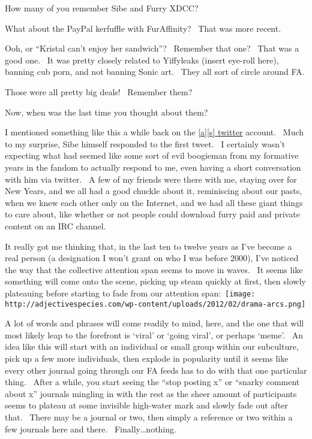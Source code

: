 How many of you remember Sibe and Furry XDCC?

What about the PayPal kerfuffle with FurAffinity? ~That was more recent.

Ooh, or ``Kristal can't enjoy her sandwich''? ~Remember that one? ~That
was a good one. ~It was pretty closely related to Yiffyleaks (insert
eye-roll here), banning cub porn, and not banning Sonic art. ~They all
sort of circle around FA.

Those were all pretty big deals! ~Remember them?

Now, when was the last time you thought about them?

I mentioned something like this a while back on the
\href{http://twitter.com/adjspecies}{{[}a{]}{[}s{]} twitter} account.
~Much to my surprise, Sibe himself responded to the first tweet. ~I
certainly wasn't expecting what had seemed like some sort of evil
boogieman from my formative years in the fandom to actually respond to
me, even having a short conversation with him via twitter. ~A few of my
friends were there with me, staying over for New Years, and we all had a
good chuckle about it, reminiscing about our pasts, when we knew each
other only on the Internet, and we had all these giant things to care
about, like whether or not people could download furry paid and private
content on an IRC channel.

It really got me thinking that, in the last ten to twelve years as I've
become a real person (a designation I won't grant on who I was before
2000), I've noticed the way that the collective attention span seems to
move in waves. ~It seems like something will come onto the scene,
picking up steam quickly at first, then slowly plateauing before
starting to fade from our attention
span:~\texttt{[image: http://adjectivespecies.com/wp-content/uploads/2012/02/drama-arcs.png]}

A lot of words and phrases will come readily to mind, here, and the one
that will most likely leap to the forefront is `viral' or `going viral',
or perhaps `meme'. ~An idea like this will start with an individual or
small group within our subculture, pick up a few more individuals, then
explode in popularity until it seems like every other journal going
through our FA feeds has to do with that one particular thing. ~After a
while, you start seeing the ``stop posting x'' or ``snarky comment about
x'' journals mingling in with the rest as the sheer amount of
participants seems to plateau at some invisible high-water mark and
slowly fade out after that. ~There may be a journal or two, then simply
a reference or two within a few journals here and there.
~Finally\ldots{}nothing.


